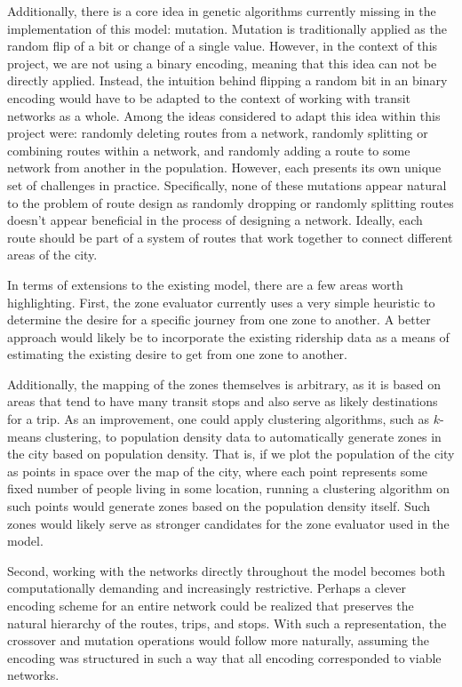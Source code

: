 \documentclass[11pt]{amsart}
\theoremstyle{definition}                  %
\theoremstyle{remark}                       %
\numberwithin{equation}{section}
\begin{document}
Additionally, there is a core idea in genetic algorithms currently missing in the implementation of this model: mutation. Mutation is traditionally applied as the random flip of a bit or change of a single value. However, in the context of this project, we are not using a binary encoding, meaning that this idea can not be directly applied. Instead, the intuition behind flipping a random bit in an binary encoding would have to be adapted to the context of working with transit networks as a whole. Among the ideas considered to adapt this idea within this project were: randomly deleting routes from a network, randomly splitting or combining routes within a network, and randomly adding a route to some network from another in the population. However, each presents its own unique set of challenges in practice. Specifically, none of these mutations appear natural to the problem of route design as randomly dropping or randomly splitting routes doesn't appear beneficial in the process of designing a network. Ideally, each route should be part of a system of routes that work together to connect different areas of the city. 

In terms of extensions to the existing model, there are a few areas worth highlighting. First, the zone evaluator currently uses a very simple heuristic to determine the desire for a specific journey from one zone to another. A better approach would likely be to incorporate the existing ridership data as a means of estimating the existing desire to get from one zone to another. 

Additionally, the mapping of the zones themselves is arbitrary, as it is based on areas that tend to have many transit stops and also serve as likely destinations for a trip. As an improvement, one could apply clustering algorithms, such as $k$-means clustering, to population density data to automatically generate zones in the city based on population density. That is, if we plot the population of the city as points in space over the map of the city, where each point represents some fixed number of people living in some location, running a clustering algorithm on such points would generate zones based on the population density itself. Such zones would likely serve as stronger candidates for the zone evaluator used in the model. 

Second, working with the networks directly throughout the model becomes both computationally demanding and increasingly restrictive. Perhaps a clever encoding scheme for an entire network could be realized that preserves the natural hierarchy of the routes, trips, and stops. With such a representation, the crossover and mutation operations would follow more naturally, assuming the encoding was structured in such a way that all encoding corresponded to viable networks. 
\end{document}
